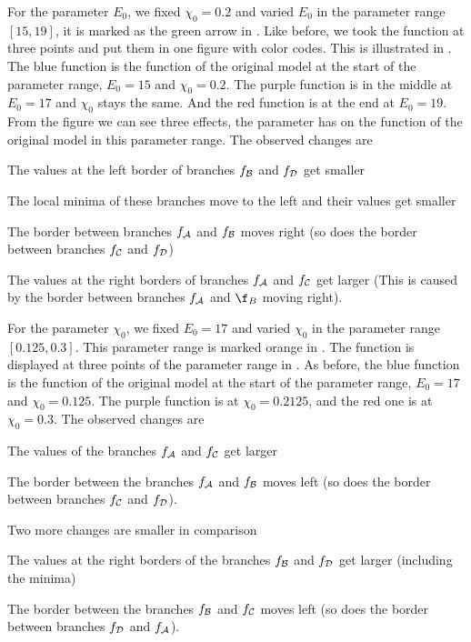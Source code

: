 For the parameter $E_0$, we fixed $\chi_0 = 0.2$ and varied $E_0$ in the parameter range $[15, 19]$, it is marked as the green arrow in .
Like before, we took the function at three points and put them in one figure with color codes.
This is illustrated in .
The blue function is the function of the original model at the start of the parameter range, $E_0 = 15$ and $\chi_0 = 0.2$.
The purple function is in the middle at $E_0 = 17$ and $\chi_0$ stays the same.
And the red function is at the end at $E_0 = 19$.
From the figure we can see three effects, the parameter has on the function of the original model in this parameter range.
The observed changes are
\begin{enumerate*}
	\item The values at the left border of branches $f_{\mathcal{B}}$ and $f_{\mathcal{D}}$ get smaller
	\item The local minima of these branches move to the left and their values get smaller
	\item The border between branches $f_{\mathcal{A}}$ and $f_{\mathcal{B}}$ moves right (so does the border between branches $f_{\mathcal{C}}$ and $f_{\mathcal{D}}$)
	\item The values at the right borders of branches $f_{\mathcal{A}}$ and $f_{\mathcal{C}}$ get larger (This is caused by the border between branches $f_{\mathcal{A}}$ and $\f_B$ moving right).
\end{enumerate*}

For the parameter $\chi_0$, we fixed $E_0 = 17$ and varied $\chi_0$ in the parameter range $[0.125, 0.3]$.
This parameter range is marked orange in .
The function is displayed at three points of the parameter range in .
As before, the blue function is the function of the original model at the start of the parameter range, $E_0 = 17$ and $\chi_0 = 0.125$.
The purple function is at $\chi_0 = 0.2125$, and the red one is at $\chi_0 = 0.3$.
The observed changes are
\begin{enumerate*}
	\item The values of the branches $f_{\mathcal{A}}$ and $f_{\mathcal{C}}$ get larger
	\item The border between the branches $f_{\mathcal{A}}$ and $f_{\mathcal{B}}$ moves left (so does the border between branches $f_{\mathcal{C}}$ and $f_{\mathcal{D}}$).
\end{enumerate*}
Two more changes are smaller in comparison
\begin{enumerate*}
	\item The values at the right borders of the branches $f_{\mathcal{B}}$ and $f_{\mathcal{D}}$ get larger (including the minima)
	\item The border between the branches $f_{\mathcal{B}}$ and $f_{\mathcal{C}}$ moves left (so does the border between branches $f_{\mathcal{D}}$ and $f_{\mathcal{A}}$).
\end{enumerate*}


